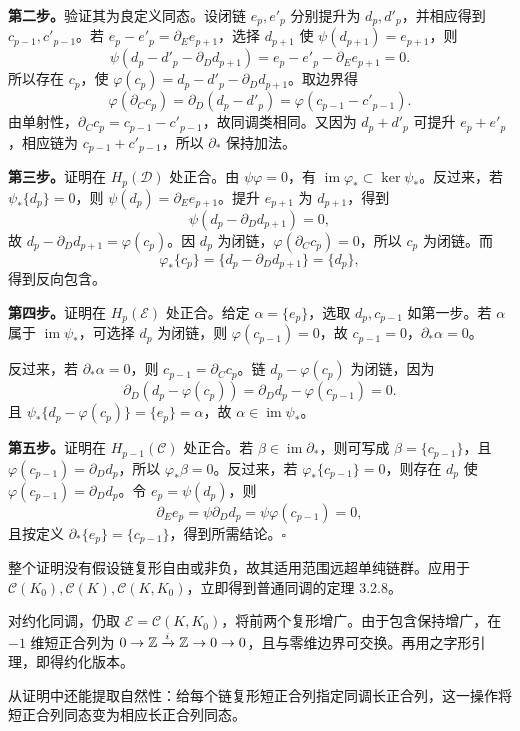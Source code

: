 \textbf{第二步。}验证其为良定义同态。设闭链 $e_p,e'_p$ 分别提升为 $d_p,d'_p$，并相应得到 $c_{p-1},c'_{p-1}$。若 $e_p-e'_p=\partial_Ee_{p+1}$，选择 $d_{p+1}$ 使 $\psi(d_{p+1})=e_{p+1}$，则
\[
\psi(d_p-d'_p-\partial_Dd_{p+1})
=e_p-e'_p-\partial_Ee_{p+1}=0.
\]
所以存在 $c_p$，使 $\varphi(c_p)=d_p-d'_p-\partial_Dd_{p+1}$。取边界得
\[
\varphi(\partial_Cc_p)=\partial_D(d_p-d'_p)
=\varphi(c_{p-1}-c'_{p-1}).
\]
由单射性，$\partial_Cc_p=c_{p-1}-c'_{p-1}$，故同调类相同。又因为 $d_p+d'_p$ 可提升 $e_p+e'_p$，相应链为 $c_{p-1}+c'_{p-1}$，所以 $\partial_*$ 保持加法。

\textbf{第三步。}证明在 $H_p(\mathcal D)$ 处正合。由 $\psi\varphi=0$，有 $\operatorname{im}\varphi_*\subset\ker\psi_*$。反过来，若 $\psi_*\{d_p\}=0$，则 $\psi(d_p)=\partial_Ee_{p+1}$。提升 $e_{p+1}$ 为 $d_{p+1}$，得到
\[
\psi(d_p-\partial_Dd_{p+1})=0,
\]
故 $d_p-\partial_Dd_{p+1}=\varphi(c_p)$。因 $d_p$ 为闭链，$\varphi(\partial_Cc_p)=0$，所以 $c_p$ 为闭链。而
\[
\varphi_*\{c_p\}=\{d_p-\partial_Dd_{p+1}\}=\{d_p\},
\]
得到反向包含。

\textbf{第四步。}证明在 $H_p(\mathcal E)$ 处正合。给定 $\alpha=\{e_p\}$，选取 $d_p,c_{p-1}$ 如第一步。若 $\alpha$ 属于 $\operatorname{im}\psi_*$，可选择 $d_p$ 为闭链，则 $\varphi(c_{p-1})=0$，故 $c_{p-1}=0$，$\partial_*\alpha=0$。

反过来，若 $\partial_*\alpha=0$，则 $c_{p-1}=\partial_Cc_p$。链 $d_p-\varphi(c_p)$ 为闭链，因为
\[
\partial_D(d_p-\varphi(c_p))=\partial_Dd_p-\varphi(c_{p-1})=0.
\]
且 $\psi_*\{d_p-\varphi(c_p)\}=\{e_p\}=\alpha$，故 $\alpha\in\operatorname{im}\psi_*$。

\textbf{第五步。}证明在 $H_{p-1}(\mathcal C)$ 处正合。若 $\beta\in\operatorname{im}\partial_*$，则可写成 $\beta=\{c_{p-1}\}$，且 $\varphi(c_{p-1})=\partial_Dd_p$，所以 $\varphi_*\beta=0$。反过来，若 $\varphi_*\{c_{p-1}\}=0$，则存在 $d_p$ 使 $\varphi(c_{p-1})=\partial_Dd_p$。令 $e_p=\psi(d_p)$，则
\[
\partial_Ee_p=\psi\partial_Dd_p=\psi\varphi(c_{p-1})=0,
\]
且按定义 $\partial_*\{e_p\}=\{c_{p-1}\}$，得到所需结论。\hfill$\square$

整个证明没有假设链复形自由或非负，故其适用范围远超单纯链群。应用于 $\mathcal C(K_0),\mathcal C(K),\mathcal C(K,K_0)$，立即得到普通同调的定理 3.2.8。

对约化同调，仍取 $\mathcal E=\mathcal C(K,K_0)$，将前两个复形增广。由于包含保持增广，在 $-1$ 维短正合列为 $0\to\mathbb{Z}\xrightarrow{i}\mathbb{Z}\to0\to0$，且与零维边界可交换。再用之字形引理，即得约化版本。

从证明中还能提取自然性：给每个链复形短正合列指定同调长正合列，这一操作将短正合列同态变为相应长正合列同态。

